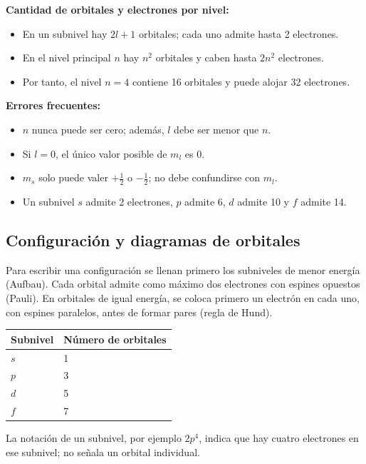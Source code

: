 \documentclass[12pt, letterpaper]{article}
\begin{document}
\begin{cuadroteoria}
  \textbf{Cantidad de orbitales y electrones por nivel:}
  \begin{itemize}[leftmargin=*]
    \item En un subnivel hay $2l+1$ orbitales; cada uno admite hasta 2 electrones.
    \item En el nivel principal $n$ hay $n^2$ orbitales y caben hasta $2n^2$ electrones.
    \item Por tanto, el nivel $n=4$ contiene 16 orbitales y puede alojar 32 electrones.
  \end{itemize}
\end{cuadroteoria}

\begin{cuadroadvertencia}
  \textbf{Errores frecuentes:}
  \begin{itemize}[leftmargin=*]
    \item $n$ nunca puede ser cero; además, $l$ debe ser menor que $n$.
    \item Si $l=0$, el único valor posible de $m_l$ es 0.
    \item $m_s$ solo puede valer $+\tfrac12$ o $-\tfrac12$; no debe confundirse con $m_l$.
    \item Un subnivel $s$ admite 2 electrones, $p$ admite 6, $d$ admite 10 y $f$ admite 14.
  \end{itemize}
\end{cuadroadvertencia}

\subsection{Configuración y diagramas de orbitales}
\begin{cuadroteoria}
  Para escribir una configuración se llenan primero los subniveles de menor energía (Aufbau). Cada orbital admite como máximo dos electrones con espines opuestos (Pauli). En orbitales de igual energía, se coloca primero un electrón en cada uno, con espines paralelos, antes de formar pares (regla de Hund).

  \begin{center}
    \begin{tabular}{ll}
      \toprule
      Subnivel & Número de orbitales \\
      \midrule
      $s$ & 1 \\
      $p$ & 3 \\
      $d$ & 5 \\
      $f$ & 7 \\
      \bottomrule
    \end{tabular}
  \end{center}
  La notación de un subnivel, por ejemplo $2p^4$, indica que hay cuatro electrones en ese subnivel; no señala un orbital individual.
\end{cuadroteoria}
\end{document}
